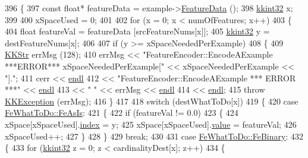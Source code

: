 \begin{DoxyCode}
396 \{
397   \textcolor{keyword}{const} \textcolor{keywordtype}{float}*  featureData = example->\hyperlink{class_k_k_m_l_l_1_1_feature_vector_af055b7c725a4d80a31cd2f6606cc37b6}{FeatureData} ();
398   \hyperlink{namespace_k_k_b_a8fa4952cc84fda1de4bec1fbdd8d5b1b}{kkint32}  x;
399 
400   xSpaceUsed = 0;
401 
402   \textcolor{keywordflow}{for}  (x = 0;  x < numOfFeatures; x++)
403   \{
404     \textcolor{keywordtype}{float}  featureVal = featureData [srcFeatureNums[x]];
405     \hyperlink{namespace_k_k_b_a8fa4952cc84fda1de4bec1fbdd8d5b1b}{kkint32}  y = destFeatureNums[x];
406 
407     \textcolor{keywordflow}{if}  (y >= xSpaceNeededPerExample)
408     \{
409       \hyperlink{class_k_k_b_1_1_k_k_str}{KKStr}  errMsg (128);
410       errMsg << \textcolor{stringliteral}{"FeatureEncoder::EncodeAExample  ***ERROR***   xSpaceNeededPerExample["} << 
      xSpaceNeededPerExample << \textcolor{stringliteral}{"]."};
411       cerr << \hyperlink{namespace_k_k_b_ad1f50f65af6adc8fa9e6f62d007818a8}{endl}
412            << \textcolor{stringliteral}{"FeatureEncoder::EncodeAExample     *** ERROR ***"}  << \hyperlink{namespace_k_k_b_ad1f50f65af6adc8fa9e6f62d007818a8}{endl}
413            << \textcolor{stringliteral}{"             "} << errMsg                           << \hyperlink{namespace_k_k_b_ad1f50f65af6adc8fa9e6f62d007818a8}{endl}
414            << \hyperlink{namespace_k_k_b_ad1f50f65af6adc8fa9e6f62d007818a8}{endl};
415       \textcolor{keywordflow}{throw} \hyperlink{class_k_k_b_1_1_k_k_exception}{KKException} (errMsg);
416     \}
417 
418     \textcolor{keywordflow}{switch} (destWhatToDo[x])
419     \{
420     \textcolor{keywordflow}{case}  \hyperlink{namespace_k_k_m_l_l_aa7a52865d78241e93b30731e46f99b43a8fdde05abb9506fd4caa93ddc4490a13}{FeWhatToDo::FeAsIs}:
421       \{
422         \textcolor{keywordflow}{if}  (featureVal != 0.0)
423         \{
424           xSpace[xSpaceUsed].\hyperlink{struct_s_v_m233_1_1svm__node_a3c4e097d4f2ba8091128a9b605fcaa12}{index} = y;
425           xSpace[xSpaceUsed].\hyperlink{struct_s_v_m233_1_1svm__node_abc3f1df2ce88e0759c7f3fe74eefcf0d}{value} = featureVal;
426           xSpaceUsed++;
427         \}
428       \}
429       \textcolor{keywordflow}{break};
430 
431     \textcolor{keywordflow}{case}  \hyperlink{namespace_k_k_m_l_l_aa7a52865d78241e93b30731e46f99b43ab88633cd9a2d1569dc1979a5e5cb1752}{FeWhatToDo::FeBinary}:
432       \{
433         \textcolor{keywordflow}{for}  (\hyperlink{namespace_k_k_b_a8fa4952cc84fda1de4bec1fbdd8d5b1b}{kkint32} z = 0; z < cardinalityDest[x]; z++)
434         \{

\end{DoxyCode}

